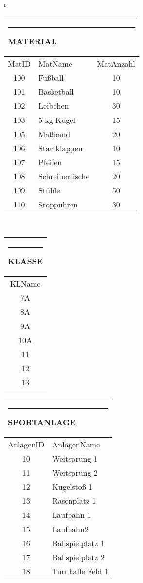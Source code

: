\documentclass[pagesize,11pt,twoside]{scrartcl}
\def\TabKopf#1#2{\multicolumn{#2}{l}{\rule{1em}{0ex}\rule{0cm}{2.73ex}\textbf{#1}}\\\hline}
\begin{document}
\begin{tabular}[t]{r}
 \begin{tabular}[t]{clc}
\TabKopf{MATERIAL}{3}
 MatID&MatName&MatAnzahl\\\hline
100&Fußball&10\\
101&Basketball&10\\
102&Leibchen&30\\
103&5 kg Kugel&15\\
105&Maßband&20\\
106&Startklappen&10\\
107&Pfeifen&15\\
108&Schreibertische&20\\
109&Stühle&50\\
110&Stoppuhren&30
\end{tabular}\\
\begin{tabular}[b]{c}
\TabKopf{KLASSE}{1}
 KLName\\\hline
7A\\
8A\\
9A\\
10A\\
11\\
12\\
13\\
\end{tabular}
\begin{tabular}[b]{cl}
\TabKopf{SPORTANLAGE}{2}
 AnlagenID&AnlagenName\\\hline
10&Weitsprung 1\\
11&Weitsprung 2\\
12&Kugelstoß 1\\
13&Rasenplatz 1\\
14&Laufbahn 1\\
15&Laufbahn2\\
16&Ballspielplatz 1\\
17&Ballspielplatz 2\\
18&Turnhalle Feld 1
\end{tabular}
\end{tabular}
\end{document}
